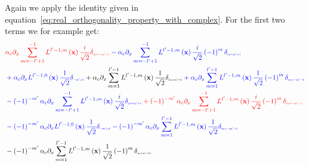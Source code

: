 Again we apply the identity given in equation~\ref{eq:real_orthogonality_property_with_complex}. For the first two terms we for example get:
\begin{align*}
&
\mathcolor{red}{}
\mathcolor{red}{\alpha_c\partial_x
\sum_{m=-l'+1}^{-1}L^{l'-1,m}\left (\vec{x}\right)
\frac{i}{\sqrt{2}}
\delta_{\scaleto{m=-m'-1}{4pt}}
}
\mathcolor{blue}{
-
}
\mathcolor{blue}{
\alpha_c\partial_x
\sum_{m=-l'+1}^{-1}L^{l'-1,m}\left (\vec{x}\right)
\frac{i}{\sqrt{2}}
\left({-1}\right)^{m}
\delta_{\scaleto{m=m'+1}{4pt}}
}
\\&
\mathcolor{blue}
{
+
}
\mathcolor{blue}
{
\alpha_c\partial_x
L^{l'-1,0}\left (\vec{x}\right)
\frac{1}{\sqrt{2}}
\delta_{\scaleto{-m'=1}{4pt}}
}
\mathcolor{black}
{
+
}
\mathcolor{black}
{
\alpha_c\partial_x
\sum_{m=1}^{l'-1}L^{l'-1,m}\left (\vec{x}\right)
\frac{1}{\sqrt{2}}
\delta_{\scaleto{m=m'+1}{4pt}}
}
\mathcolor{blue}
{
+
}
\mathcolor{blue}
{
\alpha_c\partial_x
\sum_{m=1}^{l'-1}L^{l'-1,m}\left (\vec{x}\right)
\frac{1}{\sqrt{2}}
\left({-1}\right)^{m}
\delta_{\scaleto{m=-m'-1}{4pt}}
}
\\&
\mathcolor{blue}
{
-\left({-1}\right)^{-m'}
}
\mathcolor{blue}{
\alpha_c\partial_x
\sum_{m=-l'+1}^{-1}L^{l'-1,m}\left (\vec{x}\right)
\frac{i}{\sqrt{2}}
\delta_{\scaleto{m=m'+1}{4pt}}
}
\mathcolor{red}
{
+\left({-1}\right)^{-m'}
}
\mathcolor{red}
{
\alpha_c\partial_x
\sum_{m=-l'+1}^{-1}L^{l'-1,m}\left (\vec{x}\right)
\frac{i}{\sqrt{2}}
\left({-1}\right)^{m}
\delta_{\scaleto{m=-m'-1}{4pt}}
}
\\&
\mathcolor{blue}
{
-
\left({-1}\right)^{-m'}
}
\mathcolor{blue}
{
\alpha_c\partial_x
L^{l'-1,0}\left (\vec{x}\right)
\frac{1}{\sqrt{2}}
\delta_{\scaleto{-m'=1}{4pt}}
}
\mathcolor{blue}
{
-
\left({-1}\right)^{-m'}
}
\mathcolor{blue}
{
\alpha_c\partial_x
\sum_{m=1}^{l'-1}L^{l'-1,m}\left (\vec{x}\right)
\frac{1}{\sqrt{2}}
\delta_{\scaleto{m=-m'-1}{4pt}}
}
\\&
\mathcolor{black}
{
-
\left({-1}\right)^{-m'}
}
\mathcolor{black}
{
\alpha_c\partial_x
\sum_{m=1}^{l'-1}L^{l'-1,m}\left (\vec{x}\right)
\frac{1}{\sqrt{2}}
\left({-1}\right)^{m}
\delta_{\scaleto{m=m'+1}{4pt}}
}
\end{align*}

